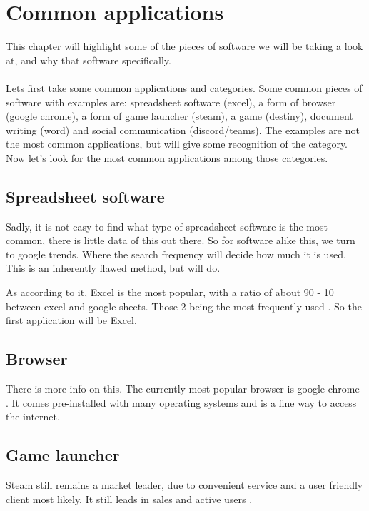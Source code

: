 \section{Common applications}
\label{sec:task}

This chapter will highlight some of the pieces of software we will be taking a look at, and why that software specifically. \\\\

Lets first take some common applications and categories. Some common pieces of software with examples are: spreadsheet software (excel), a form of browser (google chrome), a form of game launcher (steam), a game (destiny), document writing (word) and social communication (discord/teams). The examples are not the most common applications, but will give some recognition of the category.\\

Now let's look for the most common applications among those categories. 

\subsection{Spreadsheet software}
Sadly, it is not easy to find what type of spreadsheet software is the most common, there is little data of this out there. So for software alike this, we turn to google trends. Where the search frequency will decide how much it is used. This is an inherently flawed method, but will do. 

As according to it, Excel is the most popular, with a ratio of about 90 - 10 between excel and google sheets. Those 2 being the most frequently used \cite{Googletrend1}. So the first application will be Excel.

\subsection{Browser}
There is more info on this. The currently most popular browser is google chrome \cite{Statcounter1}. It comes pre-installed with many operating systems and is a fine way to access the internet. 

\subsection{Game launcher}
Steam still remains a market leader, due to convenient service and a user friendly client most likely. It still leads in sales and active users \cite{Statistica1}.

